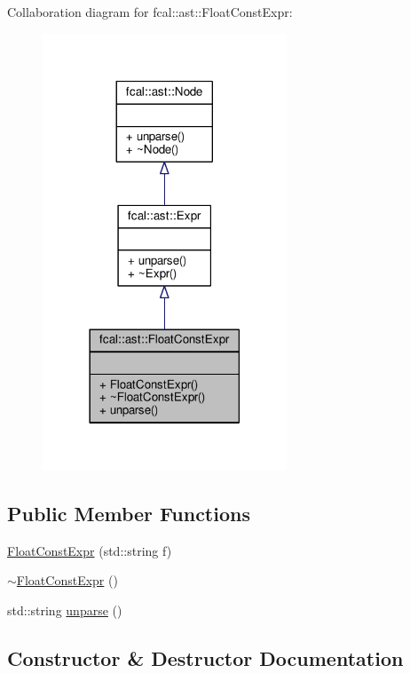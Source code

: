 Collaboration diagram for fcal\+:\+:ast\+:\+:Float\+Const\+Expr\+:
\nopagebreak
\begin{figure}[H]
\begin{center}
\leavevmode
\includegraphics[width=206pt]{classfcal_1_1ast_1_1FloatConstExpr__coll__graph}
\end{center}
\end{figure}
\subsection*{Public Member Functions}
\begin{DoxyCompactItemize}
\item 
\hyperlink{classfcal_1_1ast_1_1FloatConstExpr_a162cf50d6cc7d6bf7f7b50187f9a370a}{Float\+Const\+Expr} (std\+::string f)
\item 
\hyperlink{classfcal_1_1ast_1_1FloatConstExpr_a9c4b14923e453f33bcf93e5e8f50d2be}{$\sim$\+Float\+Const\+Expr} ()
\item 
std\+::string \hyperlink{classfcal_1_1ast_1_1FloatConstExpr_ac43f676dc814852231c0ac263d1a2628}{unparse} ()
\end{DoxyCompactItemize}


\subsection{Constructor \& Destructor Documentation}
